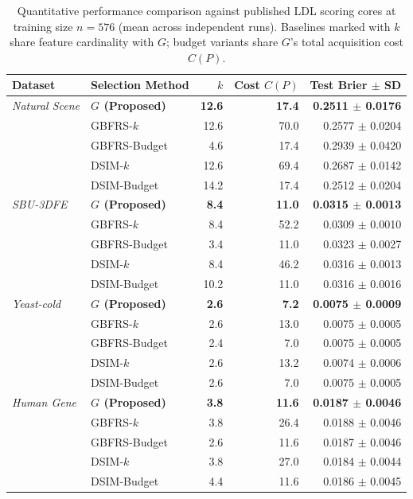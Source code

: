 \begin{table}[htbp]
	\centering\small\renewcommand{\arraystretch}{1.25}\setlength{\tabcolsep}{5pt}
	\caption{Quantitative performance comparison against published LDL scoring cores at training size $n=576$ (mean across independent runs). Baselines marked with $k$ share feature cardinality with $G$; budget variants share $G$'s total acquisition cost $C(P)$.}
	\label{tab:published-main}
	\begin{tabular}{l l rrr}\hline
		Dataset & Selection Method & $k$ & Cost $C(P)$ & Test Brier $\pm$ SD\\\hline
		\textit{Natural Scene} & \textbf{$G$ (Proposed)} & \textbf{12.6} & \textbf{17.4} & \textbf{0.2511 $\pm$ 0.0176}\\
		& GBFRS-$k$~\cite{Qian2023GBLDL} & 12.6 & 70.0 & 0.2577 $\pm$ 0.0204\\
		& GBFRS-Budget & 4.6 & 17.4 & 0.2939 $\pm$ 0.0420\\
		& DSIM-$k$~\cite{DL} & 12.6 & 69.4 & 0.2687 $\pm$ 0.0142\\
		& DSIM-Budget & 14.2 & 17.4 & 0.2512 $\pm$ 0.0204\\\hline
		\textit{SBU-3DFE} & \textbf{$G$ (Proposed)} & \textbf{8.4} & \textbf{11.0} & \textbf{0.0315 $\pm$ 0.0013}\\
		& GBFRS-$k$ & 8.4 & 52.2 & 0.0309 $\pm$ 0.0010\\
		& GBFRS-Budget & 3.4 & 11.0 & 0.0323 $\pm$ 0.0027\\
		& DSIM-$k$ & 8.4 & 46.2 & 0.0316 $\pm$ 0.0013\\
		& DSIM-Budget & 10.2 & 11.0 & 0.0316 $\pm$ 0.0016\\\hline
		\textit{Yeast-cold} & \textbf{$G$ (Proposed)} & \textbf{2.6} & \textbf{7.2} & \textbf{0.0075 $\pm$ 0.0009}\\
		& GBFRS-$k$ & 2.6 & 13.0 & 0.0075 $\pm$ 0.0005\\
		& GBFRS-Budget & 2.4 & 7.0 & 0.0075 $\pm$ 0.0005\\
		& DSIM-$k$ & 2.6 & 13.2 & 0.0074 $\pm$ 0.0006\\
		& DSIM-Budget & 2.6 & 7.0 & 0.0075 $\pm$ 0.0005\\\hline
		\textit{Human Gene} & \textbf{$G$ (Proposed)} & \textbf{3.8} & \textbf{11.6} & \textbf{0.0187 $\pm$ 0.0046}\\
		& GBFRS-$k$ & 3.8 & 26.4 & 0.0188 $\pm$ 0.0046\\
		& GBFRS-Budget & 2.6 & 11.6 & 0.0187 $\pm$ 0.0046\\
		& DSIM-$k$ & 3.8 & 27.0 & 0.0184 $\pm$ 0.0044\\
		& DSIM-Budget & 4.4 & 11.6 & 0.0186 $\pm$ 0.0045\\
		\hline\end{tabular}
\end{table}

